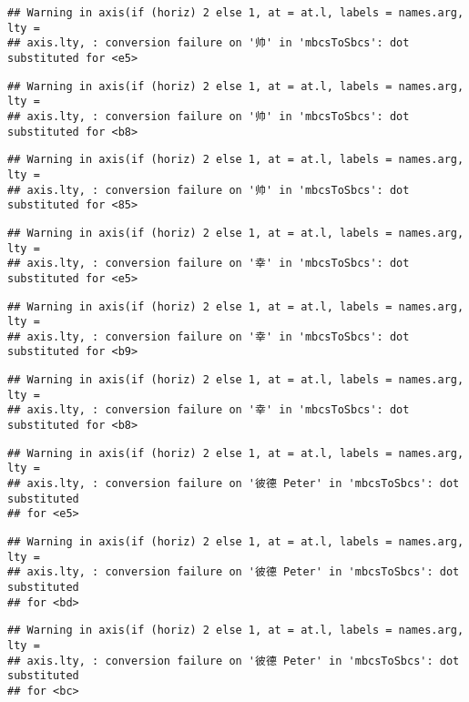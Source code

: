 \documentclass[
]{article}
\begin{document}
\begin{verbatim}
## Warning in axis(if (horiz) 2 else 1, at = at.l, labels = names.arg, lty =
## axis.lty, : conversion failure on '帅' in 'mbcsToSbcs': dot substituted for <e5>
\end{verbatim}

\begin{verbatim}
## Warning in axis(if (horiz) 2 else 1, at = at.l, labels = names.arg, lty =
## axis.lty, : conversion failure on '帅' in 'mbcsToSbcs': dot substituted for <b8>
\end{verbatim}

\begin{verbatim}
## Warning in axis(if (horiz) 2 else 1, at = at.l, labels = names.arg, lty =
## axis.lty, : conversion failure on '帅' in 'mbcsToSbcs': dot substituted for <85>
\end{verbatim}

\begin{verbatim}
## Warning in axis(if (horiz) 2 else 1, at = at.l, labels = names.arg, lty =
## axis.lty, : conversion failure on '幸' in 'mbcsToSbcs': dot substituted for <e5>
\end{verbatim}

\begin{verbatim}
## Warning in axis(if (horiz) 2 else 1, at = at.l, labels = names.arg, lty =
## axis.lty, : conversion failure on '幸' in 'mbcsToSbcs': dot substituted for <b9>
\end{verbatim}

\begin{verbatim}
## Warning in axis(if (horiz) 2 else 1, at = at.l, labels = names.arg, lty =
## axis.lty, : conversion failure on '幸' in 'mbcsToSbcs': dot substituted for <b8>
\end{verbatim}

\begin{verbatim}
## Warning in axis(if (horiz) 2 else 1, at = at.l, labels = names.arg, lty =
## axis.lty, : conversion failure on '彼德 Peter' in 'mbcsToSbcs': dot substituted
## for <e5>
\end{verbatim}

\begin{verbatim}
## Warning in axis(if (horiz) 2 else 1, at = at.l, labels = names.arg, lty =
## axis.lty, : conversion failure on '彼德 Peter' in 'mbcsToSbcs': dot substituted
## for <bd>
\end{verbatim}

\begin{verbatim}
## Warning in axis(if (horiz) 2 else 1, at = at.l, labels = names.arg, lty =
## axis.lty, : conversion failure on '彼德 Peter' in 'mbcsToSbcs': dot substituted
## for <bc>
\end{verbatim}
\end{document}
